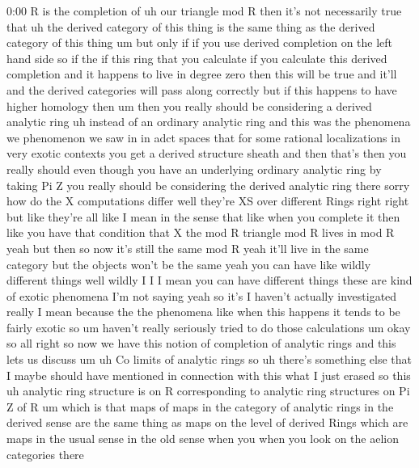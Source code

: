 \begin{unfinished}{0:00}
R  is  the
completion  of  uh  our  triangle  mod
R  then  it's  not  necessarily
true  that  uh  the  derived  category  of
this  thing  is  the  same  thing  as  the
derived  category  of  this
thing  um  but  only
if  if  you  use  derived  completion  on  the
left  hand
side  so  if  the  if  this  ring  that  you
calculate  if  you  calculate  this  derived
completion  and  it  happens  to  live  in
degree  zero  then  this  will  be  true  and
it'll  and  the  derived  categories  will
pass  along  correctly  but  if  this  happens
to  have  higher  homology  then
um  then  you  really  should  be  considering
a  derived  analytic  ring  uh  instead  of  an
ordinary  analytic  ring  and  this  was  the
phenomena  we  phenomenon  we  saw  in  in
adct  spaces  that  for  some  rational
localizations  in  very  exotic  contexts
you  get  a
derived  structure  sheath  and  then  that's
then  you  really  should  even  though  you
have  an  underlying  ordinary  analytic
ring  by  taking  Pi  Z  you  really  should  be
considering  the  derived  analytic  ring
there
sorry  how  do  the  X  computations  differ
well  they're  XS  over  different  Rings
right  right  but  like  they're  all  like  I
mean  in  the  sense  that  like  when  you
complete  it  then  like  you  have  that
condition  that  X  the  mod  R  triangle  mod
R  lives  in  mod  R  yeah  but  then  so  now
it's  still  the  same  mod  R  yeah  it'll
live  in  the  same  category  but  the
objects  won't  be  the  same  yeah  you  can
have  like  wildly  different  things  well
wildly  I  I  I  mean  you  can  have  different
things  these  are  kind  of  exotic
phenomena  I'm  not  saying  yeah  so
it's  I  haven't  actually  investigated
really  I  mean  because  the  the  phenomena
like  when  this  happens  it  tends  to  be
fairly  exotic  so  um  haven't  really
seriously  tried  to  do  those
calculations  um  okay
so  all  right  so  now  we  have  this  notion
of  completion  of  analytic  rings  and  this
lets  us  discuss
um  uh  Co  limits  of  analytic  rings
so  uh  there's  something  else  that  I
maybe  should  have  mentioned  in
connection  with  this  what  I  just  erased
so  this  uh  analytic  ring  structure  is  on
R  corresponding  to  analytic  ring
structures  on  Pi  Z  of  R  um
which  is  that  maps  of  maps  in  the
category  of  analytic  rings  in  the
derived  sense  are  the  same  thing  as  maps
on  the  level  of  derived  Rings  which  are
maps  in  the  usual  sense  in  the  old  sense
when  you  when  you  look  on  the  aelion
categories
there

\end{unfinished}
